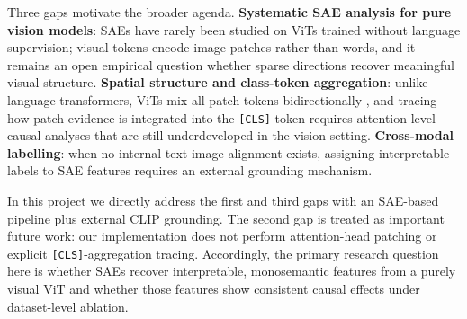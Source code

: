 Three gaps motivate the broader agenda. \textbf{Systematic SAE analysis for pure vision models}: SAEs have rarely been studied on ViTs trained without language supervision; visual tokens encode image patches rather than words, and it remains an open empirical question whether sparse directions recover meaningful visual structure. \textbf{Spatial structure and class-token aggregation}: unlike language transformers, ViTs mix all patch tokens bidirectionally \cite{Raghu2021}, and tracing how patch evidence is integrated into the \texttt{[CLS]} token requires attention-level causal analyses that are still underdeveloped in the vision setting. \textbf{Cross-modal labelling}: when no internal text-image alignment exists, assigning interpretable labels to SAE features requires an external grounding mechanism.

In this project we directly address the first and third gaps with an SAE-based pipeline plus external CLIP grounding. The second gap is treated as important future work: our implementation does not perform attention-head patching or explicit \texttt{[CLS]}-aggregation tracing. Accordingly, the primary research question here is whether SAEs recover interpretable, monosemantic features from a purely visual ViT and whether those features show consistent causal effects under dataset-level ablation.
